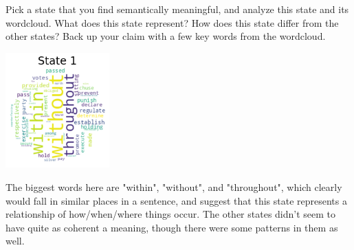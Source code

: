\indent\problem[5] %
Pick a state that you find semantically meaningful, and analyze this state and its wordcloud. What does this state represent? How does this state differ from the other states? Back up your claim with a few key words from the wordcloud.
\begin{solution}
  
  \includegraphics[width=0.3\textwidth]{images/word_cloud.png}

  The biggest words here are "within", "without", and "throughout", which clearly would fall in similar places in a sentence, and suggest that this state represents a relationship of how/when/where things occur.
  The other states didn't seem to have quite as coherent a meaning, though there were some patterns in them as well.
\end{solution}

